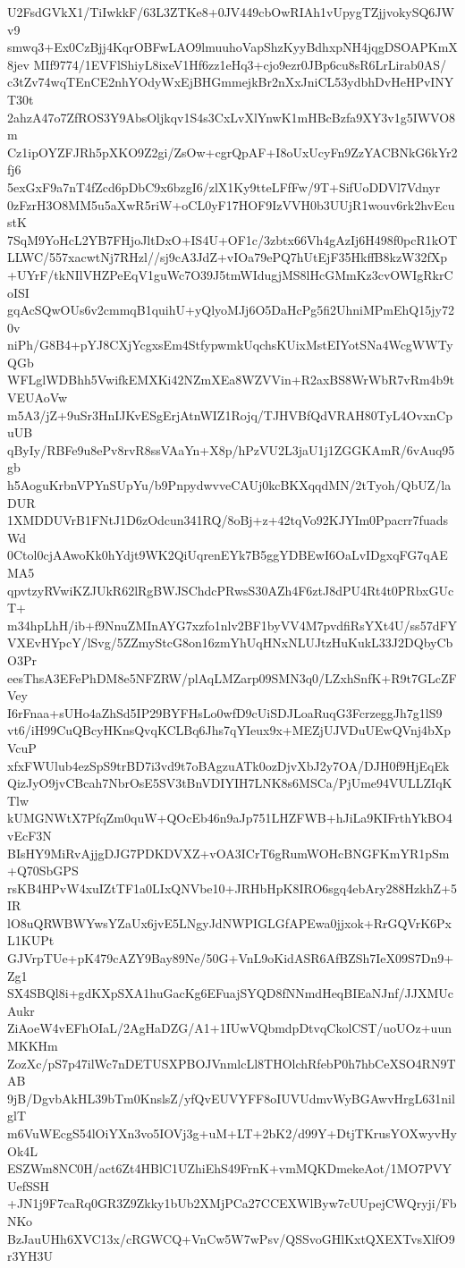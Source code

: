 U2FsdGVkX1/TiIwkkF/63L3ZTKe8+0JV449cbOwRIAh1vUpygTZjjvokySQ6JWv9
smwq3+Ex0CzBjj4KqrOBFwLAO9lmuuhoVapShzKyyBdhxpNH4jqgDSOAPKmX8jev
MIf9774/1EVFlShiyL8ixeV1Hf6zz1eHq3+cjo9ezr0JBp6cu8sR6LrLirab0AS/
c3tZv74wqTEnCE2nhYOdyWxEjBHGmmejkBr2nXxJniCL53ydbhDvHeHPvINYT30t
2ahzA47o7ZfROS3Y9AbsOljkqv1S4s3CxLvXlYnwK1mHBcBzfa9XY3v1g5IWVO8m
Cz1ipOYZFJRh5pXKO9Z2gi/ZsOw+cgrQpAF+I8oUxUcyFn9ZzYACBNkG6kYr2fj6
5exGxF9a7nT4fZcd6pDbC9x6bzgI6/zlX1Ky9tteLFfFw/9T+SifUoDDVl7Vdnyr
0zFzrH3O8MM5u5aXwR5riW+oCL0yF17HOF9IzVVH0b3UUjR1wouv6rk2hvEcustK
7SqM9YoHcL2YB7FHjoJltDxO+IS4U+OF1c/3zbtx66Vh4gAzIj6H498f0pcR1kOT
LLWC/557xacwtNj7RHzl//sj9cA3JdZ+vIOa79ePQ7hUtEjF35HkffB8kzW32fXp
+UYrF/tkNIlVHZPeEqV1guWc7O39J5tmWIdugjMS8lHcGMmKz3cvOWIgRkrCoISI
gqAcSQwOUs6v2cmmqB1quihU+yQlyoMJj6O5DaHcPg5fi2UhniMPmEhQ15jy720v
niPh/G8B4+pYJ8CXjYcgxsEm4StfypwmkUqchsKUixMstEIYotSNa4WcgWWTyQGb
WFLglWDBhh5VwifkEMXKi42NZmXEa8WZVVin+R2axBS8WrWbR7vRm4b9tVEUAoVw
m5A3/jZ+9uSr3HnIJKvESgErjAtnWIZ1Rojq/TJHVBfQdVRAH80TyL4OvxnCpuUB
qByIy/RBFe9u8ePv8rvR8ssVAaYn+X8p/hPzVU2L3jaU1j1ZGGKAmR/6vAuq95gb
h5AoguKrbnVPYnSUpYu/b9PnpydwvveCAUj0kcBKXqqdMN/2tTyoh/QbUZ/laDUR
1XMDDUVrB1FNtJ1D6zOdcun341RQ/8oBj+z+42tqVo92KJYIm0Ppacrr7fuadsWd
0Ctol0cjAAwoKk0hYdjt9WK2QiUqrenEYk7B5ggYDBEwI6OaLvIDgxqFG7qAEMA5
qpvtzyRVwiKZJUkR62lRgBWJSChdcPRwsS30AZh4F6ztJ8dPU4Rt4t0PRbxGUcT+
m34hpLhH/ib+f9NnuZMInAYG7xzfo1nlv2BF1byVV4M7pvdfiRsYXt4U/ss57dFY
VXEvHYpcY/lSvg/5ZZmyStcG8on16zmYhUqHNxNLUJtzHuKukL33J2DQbyCbO3Pr
eesThsA3EFePhDM8e5NFZRW/plAqLMZarp09SMN3q0/LZxhSnfK+R9t7GLcZFVey
I6rFnaa+sUHo4aZhSd5IP29BYFHsLo0wfD9cUiSDJLoaRuqG3FcrzeggJh7g1lS9
vt6/iH99CuQBcyHKnsQvqKCLBq6Jhs7qYIeux9x+MEZjUJVDuUEwQVnj4bXpVcuP
xfxFWUlub4ezSpS9trBD7i3vd9t7oBAgzuATk0ozDjvXbJ2y7OA/DJH0f9HjEqEk
QizJyO9jvCBcah7NbrOsE5SV3tBnVDIYIH7LNK8s6MSCa/PjUme94VULLZIqKTlw
kUMGNWtX7PfqZm0quW+QOcEb46n9aJp751LHZFWB+hJiLa9KIFrthYkBO4vEcF3N
BIsHY9MiRvAjjgDJG7PDKDVXZ+vOA3ICrT6gRumWOHcBNGFKmYR1pSm+Q70SbGPS
rsKB4HPvW4xuIZtTF1a0LIxQNVbe10+JRHbHpK8IRO6sgq4ebAry288HzkhZ+5IR
lO8uQRWBWYwsYZaUx6jvE5LNgyJdNWPIGLGfAPEwa0jjxok+RrGQVrK6PxL1KUPt
GJVrpTUe+pK479cAZY9Bay89Ne/50G+VnL9oKidASR6AfBZSh7IeX09S7Dn9+Zg1
SX4SBQl8i+gdKXpSXA1huGacKg6EFuajSYQD8fNNmdHeqBIEaNJnf/JJXMUcAukr
ZiAoeW4vEFhOIaL/2AgHaDZG/A1+1IUwVQbmdpDtvqCkolCST/uoUOz+uunMKKHm
ZozXc/pS7p47ilWc7nDETUSXPBOJVnmlcLl8THOlchRfebP0h7hbCeXSO4RN9TAB
9jB/DgvbAkHL39bTm0KnslsZ/yfQvEUVYFF8oIUVUdmvWyBGAwvHrgL631nilglT
m6VuWEcgS54lOiYXn3vo5IOVj3g+uM+LT+2bK2/d99Y+DtjTKrusYOXwyvHyOk4L
ESZWm8NC0H/act6Zt4HBlC1UZhiEhS49FrnK+vmMQKDmekeAot/1MO7PVYUefSSH
+JN1j9F7caRq0GR3Z9Zkky1bUb2XMjPCa27CCEXWlByw7cUUpejCWQryji/FbNKo
BzJauUHh6XVC13x/cRGWCQ+VnCw5W7wPsv/QSSvoGHlKxtQXEXTvsXlfO9r3YH3U
